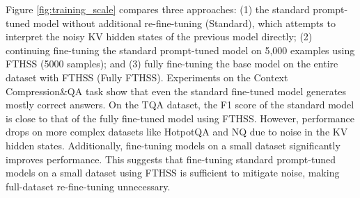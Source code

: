 

Figure \ref{fig:training_scale} compares three approaches: (1) the standard prompt-tuned model without additional re-fine-tuning (Standard), which attempts to interpret the noisy KV hidden states of the previous model directly; (2) continuing fine-tuning the standard prompt-tuned model on 5,000 examples using FTHSS (5000 samples); and (3) fully fine-tuning the base model on the entire dataset with FTHSS (Fully FTHSS). Experiments on the Context Compression\&QA task show that even the standard fine-tuned model generates mostly correct answers. On the TQA dataset, the F1 score of the standard model is close to that of the fully fine-tuned model using FTHSS. However, performance drops on more complex datasets like HotpotQA and NQ due to noise in the KV hidden states. Additionally, fine-tuning models on a small dataset significantly improves performance. This suggests that fine-tuning standard prompt-tuned models on a small dataset using FTHSS is sufficient to mitigate noise, making full-dataset re-fine-tuning unnecessary.



